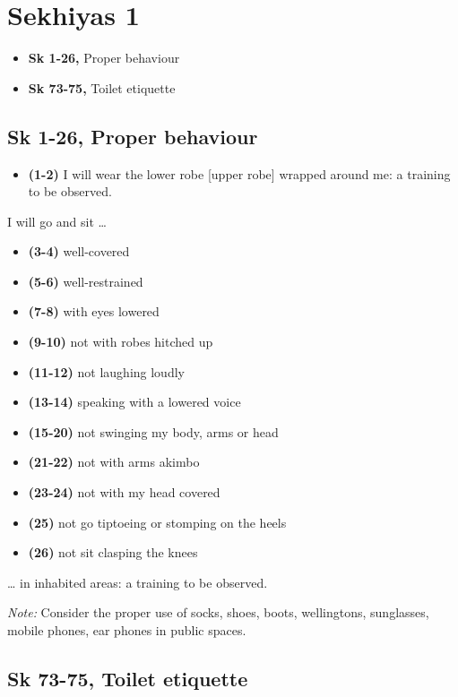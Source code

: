 \chapter{Sekhiyas 1}

\begin{itemize}
\tightlist
\item
  \textbf{Sk 1-26,} Proper behaviour
\item
  \textbf{Sk 73-75,} Toilet etiquette
\end{itemize}

\section{Sk 1-26, Proper behaviour}

\begin{itemize}
\tightlist
\item
  \textbf{(1-2)} I will wear the lower robe {[}upper robe{]} wrapped
  around me: a training to be observed.
\end{itemize}

I will go and sit \ldots{}

\begin{itemize}
\tightlist
\item
  \textbf{(3-4)} well-covered
\item
  \textbf{(5-6)} well-restrained
\item
  \textbf{(7-8)} with eyes lowered
\item
  \textbf{(9-10)} not with robes hitched up
\item
  \textbf{(11-12)} not laughing loudly
\item
  \textbf{(13-14)} speaking with a lowered voice
\item
  \textbf{(15-20)} not swinging my body, arms or head
\item
  \textbf{(21-22)} not with arms akimbo
\item
  \textbf{(23-24)} not with my head covered
\item
  \textbf{(25)} not go tiptoeing or stomping on the heels
\item
  \textbf{(26)} not sit clasping the knees
\end{itemize}

\ldots{} in inhabited areas: a training to be observed.

\emph{Note:} Consider the proper use of socks, shoes, boots,
wellingtons, sunglasses, mobile phones, ear phones in public spaces.

\section{Sk 73-75, Toilet etiquette}

